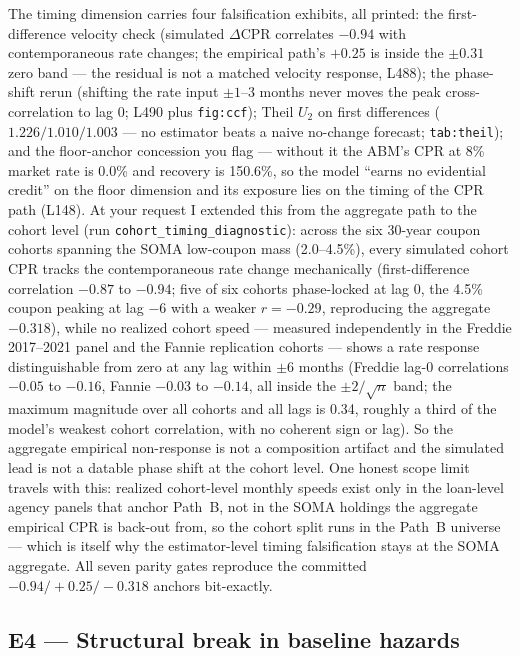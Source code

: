 \documentclass[11pt]{article}
\newcommand{\mlabel}[1]{\texttt{#1}}
\newcommand{\run}[1]{\texttt{#1}}
\begin{document}
The timing dimension carries four falsification exhibits, all printed: the
first-difference velocity check (simulated $\Delta$CPR correlates $-0.94$ with
contemporaneous rate changes; the empirical path's $+0.25$ is inside the
$\pm 0.31$ zero band --- the residual is not a matched velocity response,
L488); the phase-shift rerun (shifting the rate input $\pm 1$--$3$ months
never moves the peak cross-correlation to lag 0; L490 plus \mlabel{fig:ccf});
Theil $U_2$ on first differences ($1.226/1.010/1.003$ --- no estimator beats a
naive no-change forecast; \mlabel{tab:theil}); and the floor-anchor concession
you flag --- without it the ABM's CPR at 8\% market rate is 0.0\% and recovery
is 150.6\%, so the model ``earns no evidential credit'' on the floor dimension
and its exposure lies on the timing of the CPR path (L148). At your request I
extended this from the aggregate path to the cohort level (run
\run{cohort\_timing\_diagnostic}): across the six 30-year coupon cohorts
spanning the SOMA low-coupon mass (2.0--4.5\%), every simulated cohort CPR
tracks the contemporaneous rate change mechanically (first-difference
correlation $-0.87$ to $-0.94$; five of six cohorts phase-locked at lag 0,
the 4.5\% coupon peaking at lag $-6$ with a weaker $r=-0.29$, reproducing the
aggregate $-0.318$), while no realized cohort speed --- measured independently
in the Freddie 2017--2021 panel and the Fannie replication cohorts --- shows a
rate response distinguishable from zero at any lag within $\pm 6$ months (Freddie
lag-0 correlations $-0.05$ to $-0.16$, Fannie $-0.03$ to $-0.14$, all inside the
$\pm 2/\sqrt{n}$ band; the maximum magnitude over all cohorts and all lags is
0.34, roughly a third of the model's weakest cohort correlation, with no
coherent sign or lag). So the aggregate empirical
non-response is not a composition artifact and the simulated lead is not a
datable phase shift at the cohort level. One honest scope limit travels with
this: realized cohort-level monthly speeds exist only in the loan-level agency
panels that anchor Path~B, not in the SOMA holdings the aggregate empirical
CPR is back-out from, so the cohort split runs in the Path~B universe --- which
is itself why the estimator-level timing falsification stays at the SOMA
aggregate. All seven parity gates reproduce the committed
$-0.94/+0.25/-0.318$ anchors bit-exactly.

\subsection*{E4 --- Structural break in baseline hazards}
\end{document}
